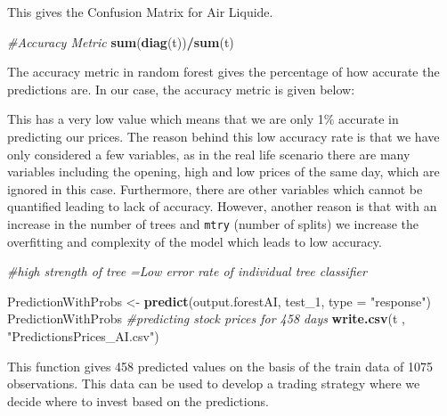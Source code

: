 \documentclass[
  11pt,
]{article}
\newenvironment{Shaded}{\begin{snugshade}}{\end{snugshade}}
\newcommand{\CommentTok}[1]{\textcolor[rgb]{0.56,0.35,0.01}{\textit{#1}}}
\newcommand{\DataTypeTok}[1]{\textcolor[rgb]{0.13,0.29,0.53}{#1}}
\newcommand{\DecValTok}[1]{\textcolor[rgb]{0.00,0.00,0.81}{#1}}
\newcommand{\FloatTok}[1]{\textcolor[rgb]{0.00,0.00,0.81}{#1}}
\newcommand{\KeywordTok}[1]{\textcolor[rgb]{0.13,0.29,0.53}{\textbf{#1}}}
\newcommand{\NormalTok}[1]{#1}
\newcommand{\OperatorTok}[1]{\textcolor[rgb]{0.81,0.36,0.00}{\textbf{#1}}}
\newcommand{\StringTok}[1]{\textcolor[rgb]{0.31,0.60,0.02}{#1}}
\begin{document}
This gives the Confusion Matrix for Air Liquide.

\begin{Shaded}
\begin{Highlighting}[]
\CommentTok{#Accuracy Metric}
\KeywordTok{sum}\NormalTok{(}\KeywordTok{diag}\NormalTok{(t))}\OperatorTok{/}\KeywordTok{sum}\NormalTok{(t)}
\end{Highlighting}
\end{Shaded}

The accuracy metric in random forest gives the percentage of how
accurate the predictions are. In our case, the accuracy metric is given
below:

\begin{Shaded}
\end{Shaded}

This has a very low value which means that we are only 1\% accurate in
predicting our prices. The reason behind this low accuracy rate is that
we have only considered a few variables, as in the real life scenario
there are many variables including the opening, high and low prices of
the same day, which are ignored in this case. Furthermore, there are
other variables which cannot be quantified leading to lack of accuracy.
However, another reason is that with an increase in the number of trees
and \texttt{mtry} (number of splits) we increase the overfitting and
complexity of the model which leads to low accuracy.

\begin{Shaded}
\begin{Highlighting}[]
\CommentTok{#high strength of tree =Low error rate of individual tree classifier}

\NormalTok{PredictionWithProbs <-}\StringTok{ }\KeywordTok{predict}\NormalTok{(output.forestAI, test_}\DecValTok{1}\NormalTok{, }\DataTypeTok{type =} \StringTok{"response"}\NormalTok{)}
\NormalTok{PredictionWithProbs         }\CommentTok{#predicting stock prices for 458 days}
\KeywordTok{write.csv}\NormalTok{(t , }\StringTok{"PredictionsPrices_AI.csv"}\NormalTok{)}
\end{Highlighting}
\end{Shaded}

This function gives 458 predicted values on the basis of the train data
of 1075 observations. This data can be used to develop a trading
strategy where we decide where to invest based on the predictions.
\end{document}
